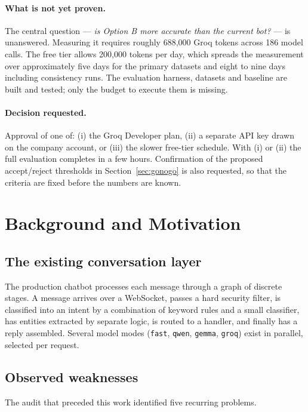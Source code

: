 \documentclass[11pt,a4paper]{article}
\newcommand{\fn}[1]{\texttt{\small #1}}
\begin{document}
\paragraph{What is not yet proven.} The central question --- \emph{is Option B more accurate
than the current bot?} --- is unanswered. Measuring it requires roughly 688{,}000 Groq tokens
across 186 model calls. The free tier allows 200{,}000 tokens per day, which spreads the
measurement over approximately five days for the primary datasets and eight to nine days
including consistency runs. The evaluation harness, datasets and baseline are built and
tested; only the budget to execute them is missing.

\paragraph{Decision requested.} Approval of one of: (i) the Groq Developer plan, (ii) a
separate API key drawn on the company account, or (iii) the slower free-tier schedule. With
(i) or (ii) the full evaluation completes in a few hours. Confirmation of the proposed
accept/reject thresholds in Section~\ref{sec:gonogo} is also requested, so that the
criteria are fixed before the numbers are known.

\section{Background and Motivation}

\subsection{The existing conversation layer}

The production chatbot processes each message through a graph of discrete stages. A message
arrives over a WebSocket, passes a hard security filter, is classified into an intent by a
combination of keyword rules and a small classifier, has entities extracted by separate
logic, is routed to a handler, and finally has a reply assembled. Several model modes
(\fn{fast}, \fn{qwen}, \fn{gemma}, \fn{groq}) exist in parallel, selected per request.

\subsection{Observed weaknesses}

The audit that preceded this work identified five recurring problems.
\end{document}
